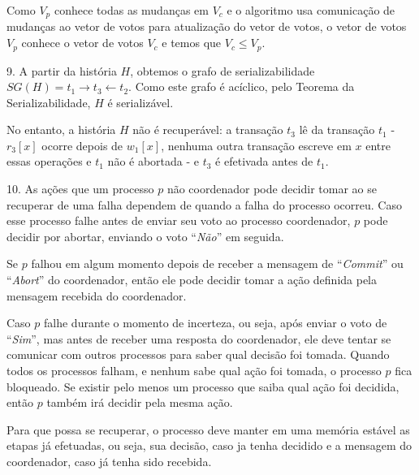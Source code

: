\documentclass[a4paper]{article}
\begin{document}
Como $V_p$ conhece todas as mudanças em $V_c$ e o algoritmo usa comunicação de mudanças ao vetor de votos para atualização do vetor de votos, o vetor de votos $V_p$ conhece o vetor de votos $V_c$ e temos que $V_c \leq V_p$.

\bigskip

9. A partir da história $H$, obtemos o grafo de serializabilidade $SG(H) = t_1 \rightarrow t_3 \leftarrow t_2$.
Como este grafo é acíclico, pelo Teorema da Serializabilidade, $H$ é serializável.

No entanto, a história $H$ não é recuperável: a transação $t_3$ lê da transação $t_1$ - $r_3[x]$ ocorre depois de $w_1[x]$, nenhuma outra transação escreve em $x$ entre essas operações e $t_1$ não é abortada - e $t_3$ é efetivada antes de $t_1$.

\bigskip

10. As ações que um processo $p$ não coordenador pode decidir tomar ao se recuperar de uma falha dependem de quando a falha do processo ocorreu. Caso esse processo falhe antes de enviar seu voto ao processo coordenador, $p$ pode decidir por abortar, enviando o voto ``\textit{Não}'' em seguida.

Se $p$ falhou em algum momento depois de receber a mensagem de ``\textit{Commit}'' ou ``\textit{Abort}'' do coordenador, então ele pode decidir tomar a ação definida pela mensagem recebida do coordenador.

Caso $p$ falhe durante o momento de incerteza, ou seja, após enviar o voto de ``\textit{Sim}'', mas antes de receber uma resposta do coordenador, ele deve tentar se comunicar com outros processos para saber qual decisão foi tomada.
Quando todos os processos falham, e nenhum sabe qual ação foi tomada, o processo $p$ fica bloqueado.
Se existir pelo menos um processo que saiba qual ação foi decidida, então $p$ também irá decidir pela mesma ação.

Para que possa se recuperar, o processo deve manter em uma memória estável as etapas já efetuadas, ou seja, sua decisão, caso ja tenha decidido e a mensagem do coordenador, caso já tenha sido recebida.
\end{document}
